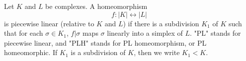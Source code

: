 Let $K$ and $L$ be complexes. A homeomorphism
$$f: |K| \leftrightarrow |L|$$
is piecewise linear (relative to $K$ and $L$) if there is a subdivision $K_1$ of $K$ such that for each $\sigma \in K_1$, $f|\sigma$ maps $\sigma$ linearly into a simplex of $L$. "PL" stands for piecewise linear, and "PLH" stands for PL homeomorphism, or PL homeomorphic. If $K_1$ is a subdivision of $K$, then we write $K_1 < K$.
